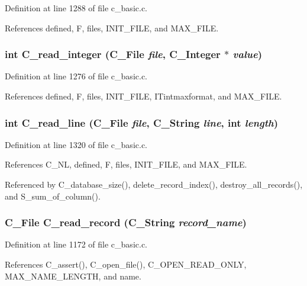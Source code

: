 Definition at line 1288 of file c\_\-basic.c.

References defined, F, files, INIT\_\-FILE, and MAX\_\-FILE.
\subsubsection{\setlength{\rightskip}{0pt plus 5cm}int C\_\-read\_\-integer (\bf{C\_\-File} {\em file}, \bf{C\_\-Integer} $\ast$ {\em value})}\label{c__basic_8h_a8011b1606a32daec8c4db9275637502}




Definition at line 1276 of file c\_\-basic.c.

References defined, F, files, INIT\_\-FILE, ITintmaxformat, and MAX\_\-FILE.
\subsubsection{\setlength{\rightskip}{0pt plus 5cm}int C\_\-read\_\-line (\bf{C\_\-File} {\em file}, \bf{C\_\-String} {\em line}, int {\em length})}\label{c__basic_8h_1a6df81884446dd41e688bd638ef3755}




Definition at line 1320 of file c\_\-basic.c.

References C\_\-NL, defined, F, files, INIT\_\-FILE, and MAX\_\-FILE.

Referenced by C\_\-database\_\-size(), delete\_\-record\_\-index(), destroy\_\-all\_\-records(), and S\_\-sum\_\-of\_\-column().
\subsubsection{\setlength{\rightskip}{0pt plus 5cm}\bf{C\_\-File} C\_\-read\_\-record (\bf{C\_\-String} {\em record\_\-name})}\label{c__basic_8h_8f9ff98d0906472b6980c8b83905b7e9}




Definition at line 1172 of file c\_\-basic.c.

References C\_\-assert(), C\_\-open\_\-file(), C\_\-OPEN\_\-READ\_\-ONLY, MAX\_\-NAME\_\-LENGTH, and name.
